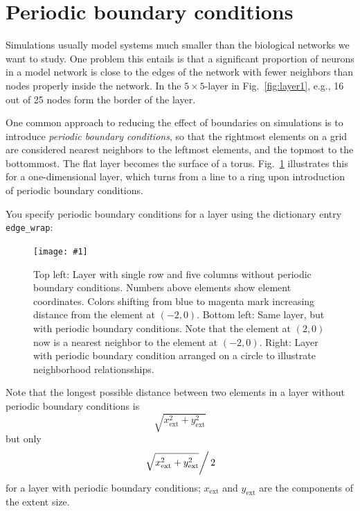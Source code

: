 \documentclass[a4paper,12pt]{report}
\newcommand{\scriptfig}[4]{%
\begin{figure}
\centerline{\texttt{[image: \#1]}}
\caption[#3]{#4}
\label{fig:#1}
\end{figure}%
}
\begin{document}
\section{Periodic boundary conditions}\label{sec:periodic}

Simulations usually model systems much smaller than the biological
networks we want to study. One problem this entails is that a
significant proportion of neurons in a model network is close to the
edges of the network with fewer neighbors than nodes properly inside
the network. In the $5\times 5$-layer in Fig.~\ref{fig:layer1}, e.g.,
16 out of 25 nodes form the border of the layer.

One common approach to reducing the effect of boundaries on
simulations is to introduce \emph{periodic boundary
  conditions}, so that the
rightmost elements on a grid are considered nearest neighbors to the
leftmost elements, and the topmost to the bottommost. The flat layer
becomes the surface of a torus. Fig.~\ref{fig:player} illustrates this
for a one-dimensional layer, which turns from a line to a ring upon
introduction of periodic boundary conditions. 

You specify periodic boundary conditions for a layer using the
dictionary entry \lstinline!edge_wrap!:
%

\scriptfig{player}{0.8}{Periodic boundary conditions.}%
{Top left: Layer with single row and five columns without periodic
  boundary conditions. Numbers above elements
  show element coordinates. Colors shifting from blue to magenta mark
  increasing distance from the element at $(-2,0)$. 
  Bottom left: Same layer, but with periodic boundary
  conditions.
  Note that the element at $(2,0)$ now is a nearest
  neighbor to the element at $(-2,0)$.
  Right: Layer with periodic boundary condition arranged on a circle
  to illustrate neighborhood relationsships.}

Note that the longest possible distance between two elements in a
layer without periodic boundary conditions is
\begin{equation*}
\sqrt{x_{\text{ext}}^2 + y_{\text{ext}}^2}
\end{equation*}
but only
\begin{equation*}
\left.\sqrt{x_{\text{ext}}^2 + y_{\text{ext}}^2}\right/ 2
\end{equation*}
for a layer with periodic boundary conditions; $x_{\text{ext}}$ and
$y_{\text{ext}}$ are the components of the extent size. 
\end{document}
